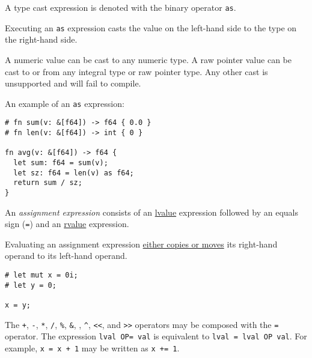 \documentclass[]{article}
\begin{document}

A type cast expression is denoted with the binary operator \texttt{as}.

Executing an \texttt{as} expression casts the value on the left-hand
side to the type on the right-hand side.

A numeric value can be cast to any numeric type. A raw pointer value can
be cast to or from any integral type or raw pointer type. Any other cast
is unsupported and will fail to compile.

An example of an \texttt{as} expression:

\begin{verbatim}
# fn sum(v: &[f64]) -> f64 { 0.0 }
# fn len(v: &[f64]) -> int { 0 }

fn avg(v: &[f64]) -> f64 {
  let sum: f64 = sum(v);
  let sz: f64 = len(v) as f64;
  return sum / sz;
}
\end{verbatim}


An \emph{assignment expression} consists of an
\hyperref[lvalues-rvalues-and-temporaries]{lvalue} expression followed
by an equals sign (\texttt{=}) and an
\hyperref[lvalues-rvalues-and-temporaries]{rvalue} expression.

Evaluating an assignment expression
\hyperref[moved-and-copied-types]{either copies or moves} its right-hand
operand to its left-hand operand.

\begin{verbatim}
# let mut x = 0i;
# let y = 0;

x = y;
\end{verbatim}


The \texttt{+}, \texttt{-}, \texttt{*}, \texttt{/}, \texttt{\%},
\texttt{\&}, \texttt{\textbar{}}, \texttt{\^{}},
\texttt{\textless{}\textless{}}, and
\texttt{\textgreater{}\textgreater{}} operators may be composed with the
\texttt{=} operator. The expression \texttt{lval OP= val} is equivalent
to \texttt{lval = lval OP val}. For example, \texttt{x = x + 1} may be
written as \texttt{x += 1}.
\end{document}
